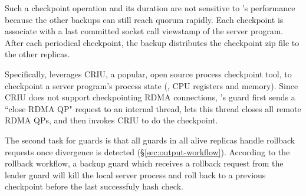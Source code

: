 Such a checkpoint operation and its duration are not sensitive to \xxx's 
performance because the other backups can still reach quorum rapidly. Each 
checkpoint is associate with a last committed socket call viewstamp of the 
server program. After each periodical checkpoint, the backup distributes the 
checkpoint zip file to the other replicas.

Specifically, \xxx leverages CRIU, a popular, open source process checkpoint 
tool, to checkpoint a server program's process state (\eg, CPU registers and 
memory). Since CRIU does not support checkpointing RDMA connections, \xxx's 
guard first sends a ``close RDMA QP" request to an \xxx internal thread, lets 
this thread closes all remote RDMA QPs, and then invokes CRIU to do the 
checkpoint.

The second task for guards is that all guards in all alive replicas handle 
rollback requests once divergence is detected (\S\ref{sec:output-workflow}). 
According to the rollback workflow, a backup guard which receives a rollback 
request from the leader guard will kill the local server process and roll back 
to a previous checkpoint before the last successfuly hash check.










% 


